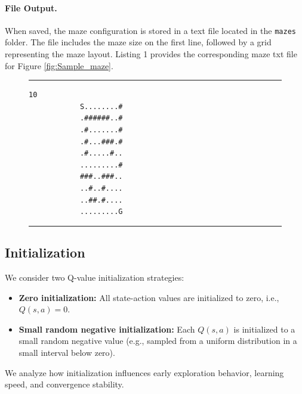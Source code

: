 \documentclass[12pt]{article}
\begin{document}
\paragraph{File Output.}
When saved, the maze configuration is stored in a text file located in the \texttt{mazes} folder. The file includes the maze size on the first line, followed by a grid representing the maze layout. Listing 1 provides the corresponding maze txt file for Figure \ref{fig:Sample_maze}.

\begin{figure}[H]
  \centering
  \hrule
  \vspace{6pt}

  \begin{minipage}{0.55\linewidth}
\begin{lstlisting}[basicstyle=\ttfamily\small,frame=none,caption={Example of \texttt{maze\_file.txt}},captionpos=t]
            10
            S........#
            .######..#
            .#.......#
            .#...###.#
            .#.....#..
            .........#
            ###..###..
            ..#..#....
            ..##.#....
            .........G
\end{lstlisting}
  \end{minipage}

  \vspace{6pt}
  \hrule
  \label{Listing:Example}
\end{figure}

\subsection{Initialization}

We consider two Q-value initialization strategies:

\begin{itemize}
\item \textbf{Zero initialization:} 
All state-action values are initialized to zero, i.e., $Q(s,a)=0$.

\item \textbf{Small random negative initialization:} 
Each $Q(s,a)$ is initialized to a small random negative value 
(e.g., sampled from a uniform distribution in a small interval below zero).
\end{itemize}

We analyze how initialization influences early exploration behavior, 
learning speed, and convergence stability.
\end{document}
